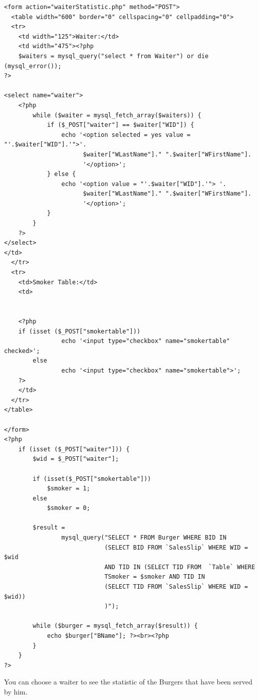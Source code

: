 \documentclass[10pt, a4paper]{article}
\begin{document}
\begin{lstlisting}[caption=waiterStatistic.php]
<form action="waiterStatistic.php" method="POST">
  <table width="600" border="0" cellspacing="0" cellpadding="0">
  <tr>
    <td width="125">Waiter:</td>
    <td width="475"><?php        
    $waiters = mysql_query("select * from Waiter") or die (mysql_error());
?>
    
<select name="waiter">            
    <?php
        while ($waiter = mysql_fetch_array($waiters)) {
            if ($_POST["waiter"] == $waiter["WID"]) {
                echo '<option selected = yes value = "'.$waiter["WID"].'">'. 
                      $waiter["WLastName"]." ".$waiter["WFirstName"].
                      '</option>';
            } else {
                echo '<option value = "'.$waiter["WID"].'"> '. 
                      $waiter["WLastName"]." ".$waiter["WFirstName"].
                      '</option>';
            }
        }
    ?>
</select>
</td>
  </tr>
  <tr>
    <td>Smoker Table:</td>
    <td>
    
    
    <?php
   	if (isset ($_POST["smokertable"]))
        		echo '<input type="checkbox" name="smokertable" checked>';
    	else
        		echo '<input type="checkbox" name="smokertable">';
    ?>
    </td>
  </tr>
</table>

</form>
<?php
    if (isset ($_POST["waiter"])) {
        $wid = $_POST["waiter"];
        
        if (isset($_POST["smokertable"])) 
            $smoker = 1;
        else
            $smoker = 0;
            
        $result = 
        		mysql_query("SELECT * FROM Burger WHERE BID IN 
                   			(SELECT BID FROM `SalesSlip` WHERE WID = $wid 
							AND TID IN (SELECT TID FROM  `Table` WHERE 
							TSmoker = $smoker AND TID IN 
                           	(SELECT TID FROM `SalesSlip` WHERE WID = $wid))
							)");
                   
        while ($burger = mysql_fetch_array($result)) {
            echo $burger["BName"]; ?><br><?php
        }        
    }
?>
\end{lstlisting}
You can choose a waiter to see the statistic of the Burgers that have been served by him.
\end{document}
